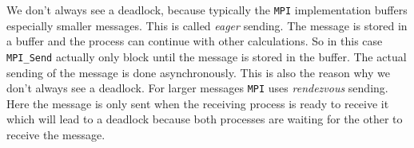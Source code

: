 \documentclass{article}
\begin{document}
\begin{enumerate}
    We don't always see a deadlock, because typically the \texttt{MPI} implementation buffers especially smaller messages. This is called \textit{eager} sending. The message is stored in a buffer and the process can continue with other calculations. So in this case \texttt{MPI\_Send} actually only block until the message is stored in the buffer. The actual sending of the message is done asynchronously. This is also the reason why we don't always see a deadlock. For larger messages \texttt{MPI} uses \textit{rendezvous} sending. Here the message is only sent when the receiving process is ready to receive it which will lead to a deadlock because both processes are waiting for the other to receive the message.
\end{enumerate}
\end{document}
